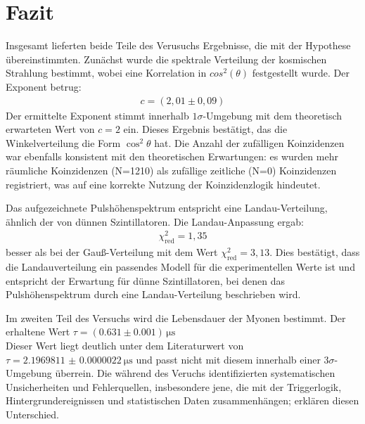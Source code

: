 \chapter{Fazit}
Insgesamt lieferten beide Teile des Verusuchs Ergebnisse, die mit der Hypothese übereinstimmten. Zunächst wurde die spektrale Verteilung der kosmischen Strahlung bestimmt, wobei eine Korrelation in $cos^2(\theta)$ festgestellt wurde. Der Exponent betrug:
\begin{align*}
    c = (2{,}01 \pm 0{,}09)
\end{align*}
Der ermittelte Exponent stimmt innerhalb $1\sigma$-Umgebung mit dem theoretisch erwarteten Wert von $c = 2$ ein.
Dieses Ergebnis bestätigt, das die Winkelverteilung die Form $\cos^2\theta$ hat.
Die Anzahl der zufälligen Koinzidenzen war ebenfalls konsistent mit den theoretischen Erwartungen: es wurden mehr räumliche Koinzidenzen (N=1210) als zufällige zeitliche (N=0) Koinzidenzen registriert, was auf eine korrekte Nutzung der Koinzidenzlogik hindeutet.

Das aufgezeichnete Pulshöhenspektrum entspricht eine Landau-Verteilung, ähnlich der von dünnen Szintillatoren. Die Landau-Anpassung ergab:
\begin{align*}
    \chi^2_{\text{red}}=1,35
\end{align*}
besser als bei der Gauß-Verteilung mit dem Wert $\chi^2_{\text{red}}=3,13$. Dies bestätigt, dass die Landauverteilung ein passendes Modell für die experimentellen Werte ist und entspricht der Erwartung für dünne Szintillatoren, bei denen das Pulshöhenspektrum durch eine Landau-Verteilung beschrieben wird.

Im zweiten Teil des Versuchs wird die Lebensdauer der Myonen bestimmt. Der erhaltene Wert
$\tau = (\num{0.631} \pm \num{0.001})\,\si{\micro\second}$ \\
Dieser Wert liegt deutlich unter dem Literaturwert von \(\tau = \SI{2.1969811(22)}{\micro\second}\) und passt nicht mit diesem innerhalb einer $3\sigma$-Umgebung überrein.
Die während des Veruchs identifizierten systematischen Unsicherheiten und Fehlerquellen, insbesondere jene, die mit der Triggerlogik, Hintergrundereignissen und statistischen Daten zusammenhängen; erklären diesen Unterschied. 
